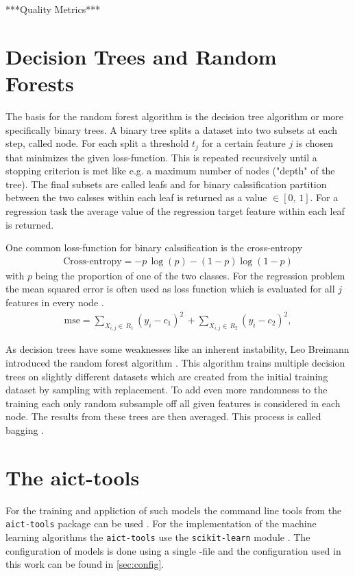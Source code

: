 ***Quality Metrics***


\section{Decision Trees and Random Forests}
The basis for the random forest algorithm is the decision tree algorithm \cite{breiman1984classification} or more specifically binary trees.
A binary tree splits a dataset into two subsets at each step, called node.
For each split a threshold $t_j$ for a certain feature $j$ is chosen that minimizes the given loss-function.
This is repeated recursively until a stopping criterion is met like e.g. a maximum number of nodes ("depth" of the tree). 
The final subsets are called leafs and for binary calssification partition between the two calsses within each leaf is returned as a value $\in [0,\, 1]$.
For a regression task the average value of the regression target feature within each leaf is returned.

One common loss-function for binary calssification is the cross-entropy
\begin{align}
    \text{Cross-entropy} = - p\, \log(p) - (1 - p) \log(1-p)
\end{align}
with $p$ being the proportion of one of the two classes.
For the regression problem the mean squared error is often used as loss function which is evaluated for all $j$ features in every node \cite{hastie2009elements}.
\begin{align}
    \text{mse} = \sum_{X_{i,j} \in\, R_1} (y_i - c_1)^2\, + \sum_{X_{i,j} \in\, R_2} (y_i - c_2)^2,
\end{align}

As decision trees have some weaknesses like an inherent instability, Leo Breimann introduced the random forest algorithm \cite{breiman2001random}. 
This algorithm trains multiple decision trees on slightly different datasets which are created from the initial training dataset by sampling with replacement.
To add even more randomness to the training each only random subsample off all given features is considered in each node. 
The results from these trees are then averaged.
This process is called bagging \cite{breiman1996bagging}.


\section{The aict-tools}
For the training and appliction of such models the command line tools from the \texttt{aict-tools} package can be used \cite{aict-tools}. 
For the implementation of the machine learning algorithms the \texttt{aict-tools} use the \texttt{scikit-learn} module \cite{scikit-learn}.
The configuration of models is done using a single -file and the configuration used in this work can be found in \autoref{sec:config}.


